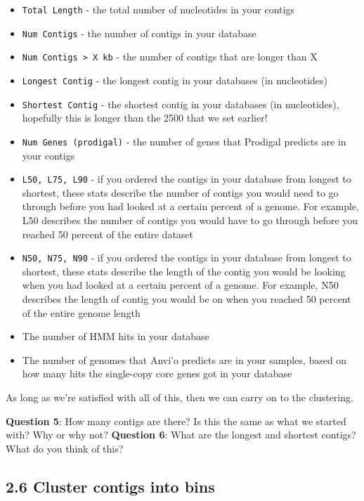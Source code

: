 \documentclass[
]{book}
\providecommand{\tightlist}{%
  \setlength{\itemsep}{0pt}\setlength{\parskip}{0pt}}
\begin{document}
\begin{itemize}
\tightlist
\item
  \texttt{Total\ Length} - the total number of nucleotides in your contigs
\item
  \texttt{Num\ Contigs} - the number of contigs in your database
\item
  \texttt{Num\ Contigs\ \textgreater{}\ X\ kb} - the number of contigs that are longer than X
\item
  \texttt{Longest\ Contig} - the longest contig in your databases (in nucleotides)
\item
  \texttt{Shortest\ Contig} - the shortest contig in your databases (in nucleotides), hopefully this is longer than the 2500 that we set earlier!
\item
  \texttt{Num\ Genes\ (prodigal)} - the number of genes that Prodigal predicts are in your contigs
\item
  \texttt{L50,\ L75,\ L90} - if you ordered the contigs in your database from longest to shortest, these stats describe the number of contigs you would need to go through before you had looked at a certain percent of a genome. For example, L50 describes the number of contigs you would have to go through before you reached 50 percent of the entire dataset
\item
  \texttt{N50,\ N75,\ N90} - if you ordered the contigs in your database from longest to shortest, these stats describe the length of the contig you would be looking when you had looked at a certain percent of a genome. For example, N50 describes the length of contig you would be on when you reached 50 percent of the entire genome length
\item
  The number of HMM hits in your database
\item
  The number of genomes that Anvi'o predicts are in your samples, based on how many hits the single-copy core genes got in your database
\end{itemize}

As long as we're satisfied with all of this, then we can carry on to the clustering.

\textbf{Question 5}: How many contigs are there? Is this the same as what we started with? Why or why not?
\textbf{Question 6}: What are the longest and shortest contigs? What do you think of this?

\subsection{2.6 Cluster contigs into bins}\label{cluster-contigs-into-bins}
\end{document}
